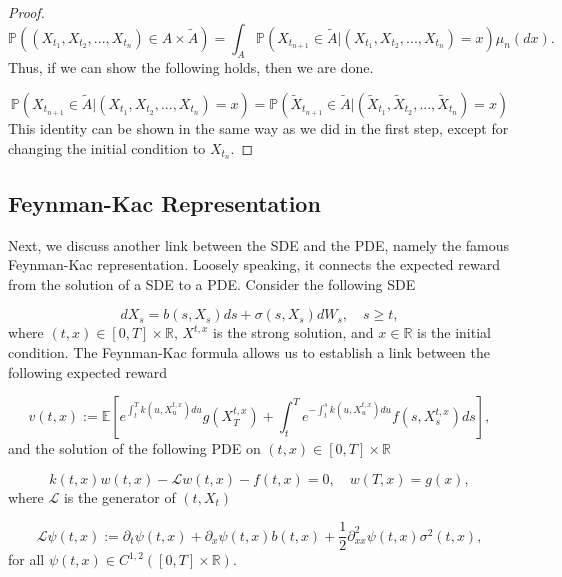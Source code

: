 \documentclass{article}
\begin{document}
\begin{proof}
\begin{equation*}
\mathbb{P}((X_{t_1},X_{t_2},...,X_{t_n})\in A\times\tilde{A})=\int_A\mathbb{P}(X_{t_{n+1}}\in\tilde{A}|(X_{t_1},X_{t_2},...,X_{t_n})=x)\mu_n(dx).
\end{equation*}
Thus, if we can show the following holds, then we are done.

\begin{equation*}
\mathbb{P}(X_{t_{n+1}}\in\tilde{A}|(X_{t_1},X_{t_2},...,X_{t_n})=x)=\mathbb{P}(\tilde{X}_{t_{n+1}}\in\tilde{A}|(\tilde{X}_{t_1},\tilde{X}_{t_2},...,\tilde{X}_{t_n})=x)
\end{equation*}
This identity can be shown in the same way as we did in the first step, except for changing the initial condition to $X_{t_n}$. 

\end{proof}

\subsection{Feynman-Kac Representation} \label{sec:feynman-kac}

Next, we discuss another link between the SDE and the PDE, namely the famous Feynman-Kac representation. Loosely speaking, it connects the expected reward from the solution of a SDE to a PDE. Consider the following SDE

\begin{equation} \label{feynman_kac_sde}
dX_s = b(s,X_s)ds + \sigma(s,X_s)dW_s, \quad s\geq t,
\end{equation}
where $(t,x)\in[0,T]\times\mathbb{R}$, $X^{t,x}$ is the strong solution, and $x\in\mathbb{R}$ is the initial condition. The Feynman-Kac formula allows us to establish a link between the following expected reward

\begin{equation} \label{feynman_kac_reward}
v(t,x):=\mathbb{E}\left[e^{\int_t^Tk(u,X_u^{t,x})du}g(X_T^{t,x})+\int^T_te^{-\int^s_tk(u,X_u^{t,x})du}f(s,X_s^{t,x})ds\right],
\end{equation}
and the solution of the following PDE on $(t,x)\in[0,T]\times\mathbb{R}$

\begin{equation} \label{feynman_kac_pde}
k(t,x)w(t,x)-\mathcal{L}w(t,x)-f(t,x)=0, \quad w(T,x)=g(x),
\end{equation}
where $\mathcal{L}$ is the generator of $(t,X_t)$

\begin{equation} \label{feynman_kac_generator}
\mathcal{L}\psi(t,x):=\partial_t\psi(t,x)+\partial_x\psi(t,x)b(t,x)+\frac{1}{2}\partial^2_{xx}\psi(t,x)\sigma^2(t,x),
\end{equation}
for all $\psi(t,x)\in C^{1,2}([0,T]\times\mathbb{R})$.
\end{document}
